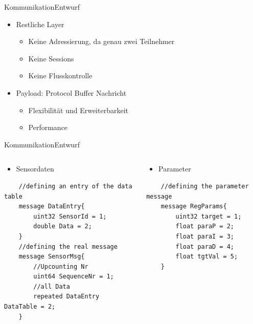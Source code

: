 \begin{frame}{Kommunikation}{Entwurf}
  \begin{itemize}
    \item Restliche Layer
    \begin{itemize}
    \item Keine Adressierung, da genau zwei Teilnehmer
    \item Keine Sessions
    \item Keine Flusskontrolle
    \end{itemize}
    \item Payload: Protocol Buffer Nachricht
    \begin{itemize}
      \item Flexibilität und Erweiterbarkeit
      \item Performance
    \end{itemize}
  \end{itemize}
\end{frame}
\begin{frame}[fragile]{Kommunikation}{Entwurf}
  \begin{columns}[T]
  \begin{column}{5cm}
    \begin{itemize}
      \item Sensordaten
    \end{itemize}
    \begin{lstlisting}
    //defining an entry of the data table
    message DataEntry{
	    uint32 SensorId = 1;
	    double Data = 2;
    }
    //defining the real message
    message SensorMsg{
	    //Upcounting Nr
	    uint64 SequenceNr = 1;
	    //all Data
	    repeated DataEntry DataTable = 2;
    }
    \end{lstlisting}
  \end{column}
  \begin{column}{5cm}
    \begin{itemize}
      \item Parameter
    \end{itemize}
    \begin{lstlisting}
    //defining the parameter message
    message RegParams{
	    uint32 target = 1;
	    float paraP = 2;
	    float paraI = 3;
	    float paraD = 4;
	    float tgtVal = 5;
    }
    \end{lstlisting}
  \end{column}
  \end{columns}
\end{frame}
